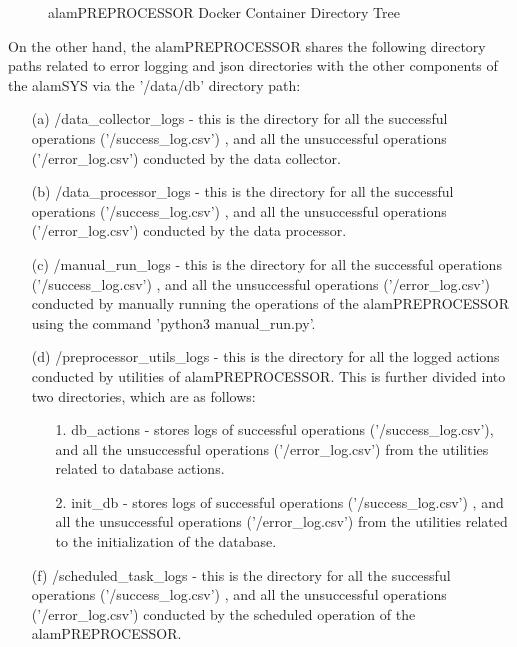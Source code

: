\begin{figure}[ht]
    \caption{alamPREPROCESSOR Docker Container Directory Tree}
    \label{fig:alampreproc_tree}
\end{figure}
\FloatBarrier

On the other hand, the alamPREPROCESSOR shares the following directory paths related to error 
logging and json directories with the other components of the alamSYS via the '/data/db' directory path:
\begin{itemize}
    \item[(a)] /data\_collector\_logs - this is the directory for all the successful operations ('/success\_log.csv')
    , and all the unsuccessful operations ('/error\_log.csv') conducted by the data collector.
    \item[(b)] /data\_processor\_logs - this is the directory for all the successful operations ('/success\_log.csv')
    , and all the unsuccessful operations ('/error\_log.csv') conducted by the data processor.
    \item[(c)] /manual\_run\_logs - this is the directory for all the successful operations ('/success\_log.csv')
    , and all the unsuccessful operations ('/error\_log.csv') conducted by manually running the operations of the 
    alamPREPROCESSOR using the command 'python3 manual\_run.py'.
    \item[(d)] /preprocessor\_utils\_logs - this is the directory for all the logged actions conducted by utilities of alamPREPROCESSOR. 
    This is further divided into two directories, which are as follows:
    \begin{itemize}
        \item[1.] db\_actions - stores logs of successful operations ('/success\_log.csv'), 
        and all the unsuccessful operations ('/error\_log.csv') from the utilities related
        to database actions.
        \item[2.] init\_db - stores logs of successful operations ('/success\_log.csv')
        , and all the unsuccessful operations ('/error\_log.csv') from the utilities related
        to the initialization of the database.
    \end{itemize}
    \item[(f)] /scheduled\_task\_logs - this is the directory for all the successful operations ('/success\_log.csv')
    , and all the unsuccessful operations ('/error\_log.csv') conducted by the scheduled operation of the alamPREPROCESSOR.
\end{itemize}